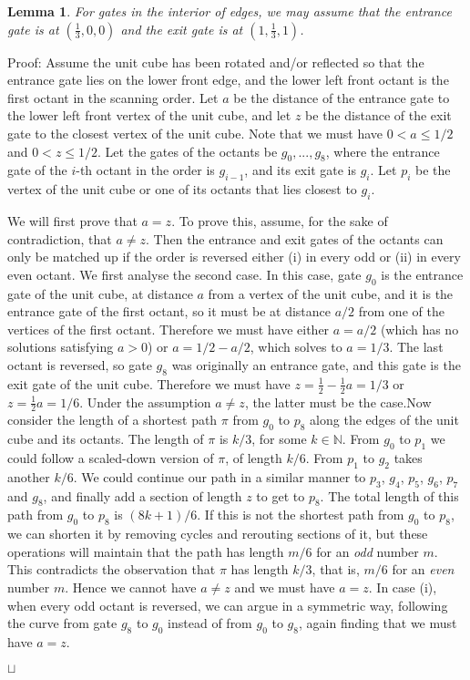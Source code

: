 \documentclass[11pt,a4paper]{article}
\newcommand{\Naturals}{\mathbb{N}}
\newtheorem{lemma}{Lemma}
\newenvironment{proof}{Proof:}{\qed}
\def\squareforqed{\hbox{\rlap{$\sqcap$}$\sqcup$}}
\def\qed{\ifmmode\squareforqed\else{\unskip\nobreak\hfil
\penalty50\hskip1em\null\nobreak\hfil\squareforqed
\parfillskip=0pt\finalhyphendemerits=0\endgraf}\fi}
\begin{document}
\begin{lemma}\label{lem:edge-edge-gates}
For gates in the interior of edges, we may assume that the entrance gate is at $(\frac13,0,0)$ and the exit gate is at $(1,\frac13,1)$.
\end{lemma}
\begin{proof}
Assume the unit cube has been rotated and/or reflected so that the entrance gate lies on the lower front edge, and the lower left front octant is the first octant in the scanning order. Let $a$ be the distance of the entrance gate to the lower left front vertex of the unit cube, and let $z$ be the distance of the exit gate to the closest vertex of the unit cube. Note that we must have $0 < a \leq 1/2$ and $0 < z \leq 1/2$. Let the gates of the octants be $g_0,...,g_8$, where the entrance gate of the $i$-th octant in the order is $g_{i-1}$, and its exit gate is $g_i$. Let $p_i$ be the vertex of the unit cube or one of its octants that lies closest to $g_i$.

We will first prove that $a = z$. To prove this, assume, for the sake of contradiction, that $a \neq z$. Then the entrance and exit gates of the octants can only be matched up if the order is reversed either (i) in every odd or (ii) in every even octant. We first analyse the second case. In this case, gate $g_0$ is the entrance gate of the unit cube, at distance $a$ from a vertex of the unit cube, and it is the entrance gate of the first octant, so it must be at distance $a/2$ from one of the vertices of the first octant. Therefore we must have either $a = a/2$ (which has no solutions satisfying $a > 0$) or $a = 1/2 - a/2$, which solves to $a = 1/3$. The last octant is reversed, so gate $g_8$ was originally an entrance gate, and this gate is the exit gate of the unit cube. Therefore we must have $z = \frac12 - \frac12a = 1/3$ or $z = \frac12a = 1/6$. Under the assumption $a \neq z$, the latter must be the case.Now consider the length of a shortest path $\pi$ from $g_0$ to $p_8$ along the edges of the unit cube and its octants. The length of $\pi$ is $k/3$, for some $k \in \Naturals$. From $g_0$ to $p_1$ we could follow a scaled-down version of $\pi$, of length $k/6$. From $p_1$ to $g_2$ takes another $k/6$. We could continue our path in a similar manner to $p_3$, $g_4$, $p_5$, $g_6$, $p_7$ and $g_8$, and finally add a section of length $z$ to get to $p_8$. The total length of this path from $g_0$ to $p_8$ is $(8k+1)/6$. If this is not the shortest path from $g_0$ to $p_8$, we can shorten it by removing cycles and rerouting sections of it, but these operations will maintain that the path has length $m/6$ for an \emph{odd} number $m$. This contradicts the observation that $\pi$ has length $k/3$, that is, $m/6$ for an \emph{even} number $m$. Hence we cannot have $a \neq z$ and we must have $a = z$. In case (i), when every odd octant is reversed, we can argue in a symmetric way, following the curve from gate $g_8$ to $g_0$ instead of from $g_0$ to $g_8$, again finding that we must have $a=z$.


\end{proof}
\end{document}
